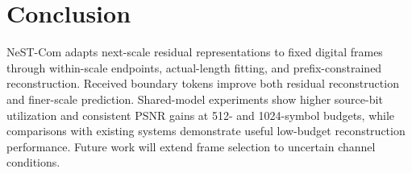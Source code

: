\section{Conclusion}
NeST-Com adapts next-scale residual representations to fixed digital frames through within-scale endpoints, actual-length fitting, and prefix-constrained reconstruction. Received boundary tokens improve both residual reconstruction and finer-scale prediction. Shared-model experiments show higher source-bit utilization and consistent PSNR gains at 512- and 1024-symbol budgets, while comparisons with existing systems demonstrate useful low-budget reconstruction performance. Future work will extend frame selection to uncertain channel conditions.
